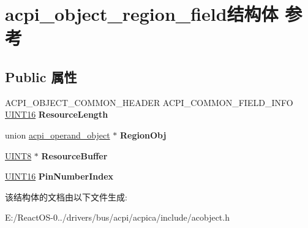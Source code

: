 \hypertarget{structacpi__object__region__field}{}\section{acpi\+\_\+object\+\_\+region\+\_\+field结构体 参考}
\label{structacpi__object__region__field}
\subsection*{Public 属性}
\begin{DoxyCompactItemize}
\item 
\mbox{\label{structacpi__object__region__field_a36460231758e3c93bde97d8f16379cec}} 
A\+C\+P\+I\+\_\+\+O\+B\+J\+E\+C\+T\+\_\+\+C\+O\+M\+M\+O\+N\+\_\+\+H\+E\+A\+D\+ER A\+C\+P\+I\+\_\+\+C\+O\+M\+M\+O\+N\+\_\+\+F\+I\+E\+L\+D\+\_\+\+I\+N\+FO \hyperlink{_processor_bind_8h_a09f1a1fb2293e33483cc8d44aefb1eb1}{U\+I\+N\+T16} {\bfseries Resource\+Length}
\item 
\mbox{\label{structacpi__object__region__field_a83f5c690fdd8d4609678afefdb1c0cc8}} 
union \hyperlink{unionacpi__operand__object}{acpi\+\_\+operand\+\_\+object} $\ast$ {\bfseries Region\+Obj}
\item 
\mbox{\label{structacpi__object__region__field_a909ac1802f5395a1dfbe25c80ea2852a}} 
\hyperlink{_processor_bind_8h_ab27e9918b538ce9d8ca692479b375b6a}{U\+I\+N\+T8} $\ast$ {\bfseries Resource\+Buffer}
\item 
\mbox{\label{structacpi__object__region__field_a606ed6a9cefdce4d52c2130888439a93}} 
\hyperlink{_processor_bind_8h_a09f1a1fb2293e33483cc8d44aefb1eb1}{U\+I\+N\+T16} {\bfseries Pin\+Number\+Index}
\end{DoxyCompactItemize}


该结构体的文档由以下文件生成\+:\begin{DoxyCompactItemize}
\item 
E\+:/\+React\+O\+S-\/0../drivers/bus/acpi/acpica/include/acobject.\+h\end{DoxyCompactItemize}
